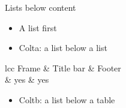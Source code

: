 \begin{standardframe}{Lists below content}
	\begin{itemize}
		\item A list first
	\end{itemize}
	\begin{itemize}
		\item Colta: a list below a list
	\end{itemize}
	\begin{SMTable}[gap=12pt]{lcc}
		\toprule
		Frame & Title bar & Footer \\
		\midrule
		 & yes & yes \\
		\bottomrule
	\end{SMTable}
	\begin{itemize}
		\item Coltb: a list below a table
	\end{itemize}
\end{standardframe}
